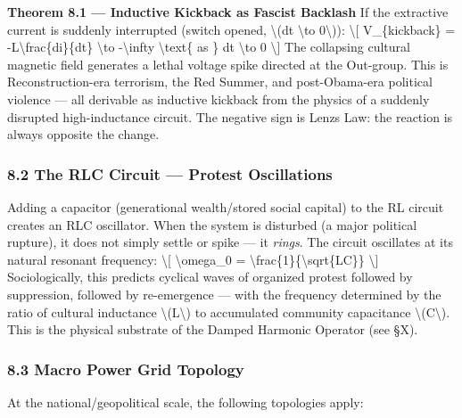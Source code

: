 {\textbf{Theorem 8.1 --- Inductive Kickback as Fascist Backlash} If the
extractive current is suddenly interrupted (switch opened,
\textbackslash(dt \textbackslash to 0\textbackslash)): \textbackslash{[}
V\_\{kickback\} = -L\textbackslash frac\{di\}\{dt\} \textbackslash to
-\textbackslash infty \textbackslash text\{ as \} dt \textbackslash to 0
\textbackslash{]} The collapsing cultural magnetic field generates a
lethal voltage spike directed at the Out-group. This is
Reconstruction-era terrorism, the Red Summer, and post-Obama-era
political violence --- all derivable as inductive kickback from the
physics of a suddenly disrupted high-inductance circuit. The negative
sign is Lenz\textquotesingle s Law: the reaction is always opposite the
change.

\subsubsection{8.2 The RLC Circuit --- Protest
Oscillations}\label{the-rlc-circuit-protest-oscillations}

Adding a capacitor (generational wealth/stored social capital) to the RL
circuit creates an RLC oscillator. When the system is disturbed (a major
political rupture), it does not simply settle or spike --- it
\emph{rings}. The circuit oscillates at its natural resonant frequency:
\textbackslash{[} \textbackslash omega\_0 =
\textbackslash frac\{1\}\{\textbackslash sqrt\{LC\}\} \textbackslash{]}
Sociologically, this predicts cyclical waves of organized protest
followed by suppression, followed by re-emergence --- with the frequency
determined by the ratio of cultural inductance
\textbackslash(L\textbackslash) to accumulated community capacitance
\textbackslash(C\textbackslash). This is the physical substrate of the
Damped Harmonic Operator (see §X).

\subsubsection{8.3 Macro Power Grid
Topology}\label{macro-power-grid-topology}

At the national/geopolitical scale, the following topologies apply:

}
